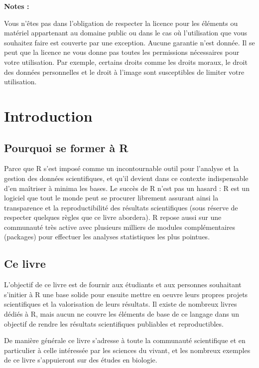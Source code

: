 \documentclass[]{book}
\theoremstyle{definition}
\theoremstyle{definition}
\theoremstyle{definition}
\theoremstyle{remark}
\begin{document}
\textbf{Notes :}

Vous n'êtes pas dans l'obligation de respecter la licence pour les
éléments ou matériel appartenant au domaine public ou dans le cas où
l'utilisation que vous souhaitez faire est couverte par une exception.
Aucune garantie n'est donnée. Il se peut que la licence ne vous donne
pas toutes les permissions nécessaires pour votre utilisation. Par
exemple, certains droits comme les droits moraux, le droit des données
personnelles et le droit à l'image sont susceptibles de limiter votre
utilisation.

\chapter{Introduction}\label{intro}

\section{Pourquoi se former à R}\label{pourquoi-se-former-a-r}

Parce que R s'est imposé comme un incontournable outil pour l'analyse et
la gestion des données scientifiques, et qu'il devient dans ce contexte
indispensable d'en maîtriser à minima les bases. Le succès de R n'est
pas un hasard : R est un logiciel que tout le monde peut se procurer
librement assurant ainsi la transparence et la reproductibilité des
résultats scientifiques (sous réserve de respecter quelques règles que
ce livre abordera). R repose aussi sur une communauté très active avec
plusieurs milliers de modules complémentaires (packages) pour effectuer
les analyses statistiques les plus pointues.

\section{Ce livre}\label{ce-livre}

L'objectif de ce livre est de fournir aux étudiants et aux personnes
souhaitant s'initier à R une base solide pour ensuite mettre en oeuvre
leurs propres projets scientifiques et la valorisation de leurs
résultats. Il existe de nombreux livres dédiés à R, mais aucun ne couvre
les éléments de base de ce langage dans un objectif de rendre les
résultats scientifiques publiables et reproductibles.

De manière générale ce livre s'adresse à toute la communauté
scientifique et en particulier à celle intéressée par les sciences du
vivant, et les nombreux exemples de ce livre s'appuieront sur des études
en biologie.
\end{document}
